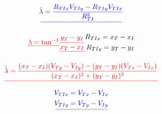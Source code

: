 \documentclass[conference]{IEEEtran}
\providecommand{\DIFadd}[1]{{\protect\color{blue}\uwave{#1}}} %
\providecommand{\DIFdel}[1]{{\protect\color{red}\sout{#1}}}                      %
\providecommand{\DIFaddbegin}{} %
\providecommand{\DIFaddend}{} %
\providecommand{\DIFdelbegin}{} %
\providecommand{\DIFdelend}{} %
\newcommand{\DIFscaledelfig}{0.5}
\newlength{\DIFdelgraphicswidth} %
\newlength{\DIFdelgraphicsheight} %
\newcommand{\DIFaddincludegraphics}[2][]{{\color{blue}\fbox{\DIFOincludegraphics[#1]{#2}}}} %
\newcommand{\DIFdelincludegraphics}[2][]{%
\sbox{\DIFdelgraphicsbox}{\DIFOincludegraphics[#1]{#2}}%
\settoboxwidth{\DIFdelgraphicswidth}{\DIFdelgraphicsbox} %
\settoboxtotalheight{\DIFdelgraphicsheight}{\DIFdelgraphicsbox} %
\scalebox{\DIFscaledelfig}{%
\parbox[b]{\DIFdelgraphicswidth}{\usebox{\DIFdelgraphicsbox}\\[-\baselineskip] \rule{\DIFdelgraphicswidth}{0em}}\llap{\resizebox{\DIFdelgraphicswidth}{\DIFdelgraphicsheight}{%
\setlength{\unitlength}{\DIFdelgraphicswidth}%
\begin{picture}(1,1)%
\thicklines\linethickness{2pt} %
{\color[rgb]{1,0,0}\put(0,0){\framebox(1,1){}}}%
{\color[rgb]{1,0,0}\put(0,0){\line( 1,1){1}}}%
{\color[rgb]{1,0,0}\put(0,1){\line(1,-1){1}}}%
\end{picture}%
}\hspace*{3pt}}} %
} %
\DeclareRobustCommand{\DIFaddbegin}{\DIFOaddbegin \let\includegraphics\DIFaddincludegraphics} %
\DeclareRobustCommand{\DIFaddend}{\DIFOaddend \let\includegraphics\DIFOincludegraphics} %
\DeclareRobustCommand{\DIFdelbegin}{\DIFOdelbegin \let\includegraphics\DIFdelincludegraphics} %
\DeclareRobustCommand{\DIFdelend}{\DIFOaddend \let\includegraphics\DIFOincludegraphics} %
\begin{document}
\DIFaddbegin \begin{equation} \DIFadd{\label{eq:losrate}
\dot{\lambda} = \frac{R_{TIx}V_{TIy}-R_{TIy}V_{TIx}}{R_{TI}^2}
}\end{equation}
\DIFaddend 

\begin{equation} \DIFdelbegin %
\DIFdel{\lambda = \tan^{-1} }%
\DIFdel{\frac{y_T - y_I}{x_T - x_I}}%
\DIFdelend \DIFaddbegin \label{eq:pos}
\begin{split}
R_{TIx} = x_T-x_I\\
R_{TIy} = y_T-y_I
\end{split}
\DIFaddend \end{equation}

\DIFdelbegin \begin{displaymath} \DIFdel{%
\dot{\lambda} = \frac{(x_T - x_I)(V_{Ty}-V_{Iy}) - (y_T - y_I)(V_{Tx}-V_{Ix})}{(x_T - x_I)^2+(y_T - y_I)^2}
}\end{displaymath}
\DIFdelend \DIFaddbegin \begin{align}
\DIFadd{\label{eq:vel}
\begin{split}
V_{TIx} &= V_{Tx}-V_{Ix}
\\
V_{TIy} &= V_{Ty}-V_{Iy}
\\
\end{split}
}\end{align}
\DIFaddend 

\DIFdelbegin %
\end{document}
